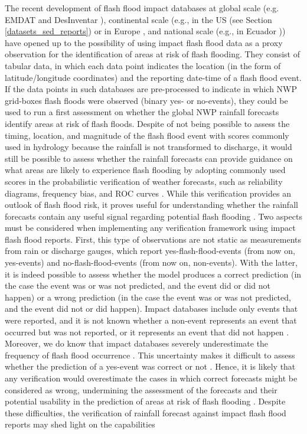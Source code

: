 The  recent development of flash flood impact databases at global scale (e.g. EMDAT and DesInventar \citep{Panwar_2020}), continental scale (e.g., in the US (see Section \ref{datasets_sed_reports}) or in Europe \citep{Dotzek_2009}, and national scale (e.g., in Ecuador \citep{Bucherie_2022a})) have opened up to the possibility of using impact flash flood data as a proxy observation for the identification of areas at risk of flash flooding. They consist of tabular data, in which each data point indicates the location (in the form of latitude/longitude coordinates) and the reporting date-time of a flash flood event. If the data points in such databases are pre-processed to indicate in which NWP grid-boxes flash floods were observed (binary yes- or no-events), they could be used to run a first assessment on whether the global NWP rainfall forecasts identify areas at risk of flash floods. Despite of not being possible to assess the timing, location, and magnitude of the flash flood event with scores commonly used in hydrology because the rainfall is not transformed to discharge, it would still be possible to assess whether the rainfall forecasts can provide guidance on what areas are likely to experience flash flooding by adopting commonly used scores in the probabilistic verification of weather forecasts, such as reliability diagrams, frequency bias, and ROC curves \citep{Jolliffe_2012, Wilks_2020}. While this verification provides an outlook of flash flood risk, it proves useful for understanding whether the rainfall forecasts contain any useful signal regarding potential flash flooding \citep{Mason_1979}. Two aspects must be considered when implementing any verification framework using impact flash flood reports. First, this type of observations are not static as measurements from rain or discharge gauges, which report yes-flash-flood-events (from now on, yes-events) and no-flash-flood-events (from now on, non-events). With the latter, it is indeed possible to assess whether the model produces a correct prediction (in the case the event was or was not predicted, and the event did or did not happen) or a wrong prediction (in the case the event was or was not predicted, and the event did not or did happen). Impact databases include only events that were reported, and it is not known whether a non-event represents an event that occurred but was not reported, or it represents an event that did not happen \citep{Marsigli_2021}. Moreover, we do know that impact databases severely underestimate the frequency of flash flood occurrence \citep{Panwar_2020}. This uncertainty makes it difficult to assess whether the prediction of a yes-event was correct or not \citep{Robbins_2018}. Hence, it is likely that any verification would overestimate the cases in which correct forecasts might be considered as wrong, undermining the assessment of the forecasts and their potential usability in the prediction of areas at risk of flash flooding \citep{Marsigli_2021, Robbins_2018}. Despite these difficulties, the verification of rainfall forecast against impact flash flood reports may shed light on the capabilities 